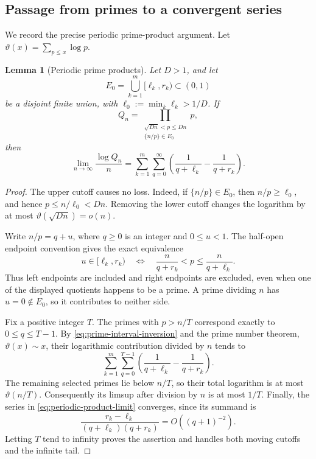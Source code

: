 \documentclass[11pt,reqno,letterpaper]{amsart}
\numberwithin{equation}{section}
\newtheorem{lemma}[theorem]{Lemma}
\theoremstyle{definition}
\theoremstyle{remark}
\begin{document}
\subsection{Passage from primes to a convergent series}

We record the precise periodic prime-product argument.  Let
\(\vartheta(x)=\sum_{p\leq x}\log p\).

\begin{lemma}[Periodic prime products]\label{lem:periodic-prime-product}
Let \(D>1\), and let
\[
 E_0=\bigcup_{k=1}^{m}[\ell_k,r_k)\subset(0,1)
\]
be a disjoint finite union, with \(\ell_0:=\min_k\ell_k>1/D\).
If
\[
 Q_n=\prod_{\substack{\sqrt{Dn}<p\leq Dn\\
                 \{n/p\}\in E_0}}p,
\]
then
\begin{equation}\label{eq:periodic-product-limit}
 \lim_{n\to\infty}\frac{\log Q_n}{n}
 =\sum_{k=1}^{m}\sum_{q=0}^{\infty}
 \left(\frac1{q+\ell_k}-\frac1{q+r_k}\right).
\end{equation}
\end{lemma}

\begin{proof}
The upper cutoff causes no loss.  Indeed, if
\(\{n/p\}\in E_0\), then \(n/p\geq\ell_0\), and hence
\(p\leq n/\ell_0<Dn\).  Removing the lower cutoff changes the logarithm
by at most \(\vartheta(\sqrt{Dn})=o(n)\).

Write \(n/p=q+u\), where \(q\geq0\) is an integer and \(0\leq u<1\).
The half-open endpoint convention gives the exact equivalence
\begin{equation}\label{eq:prime-interval-inversion}
 u\in[\ell_k,r_k)
 \quad\Longleftrightarrow\quad
 \frac{n}{q+r_k}<p\leq\frac{n}{q+\ell_k}.
\end{equation}
Thus left endpoints are included and right endpoints are excluded, even
when one of the displayed quotients happens to be a prime.  A prime
dividing \(n\) has \(u=0\notin E_0\), so it contributes to neither side.

Fix a positive integer \(T\).  The primes with \(p>n/T\) correspond
exactly to \(0\leq q\leq T-1\).  By
\eqref{eq:prime-interval-inversion} and the prime number theorem,
\(\vartheta(x)\sim x\), their logarithmic contribution divided by \(n\)
tends to
\[
 \sum_{k=1}^{m}\sum_{q=0}^{T-1}
 \left(\frac1{q+\ell_k}-\frac1{q+r_k}\right).
\]
The remaining selected primes lie below \(n/T\), so their total
logarithm is at most \(\vartheta(n/T)\).  Consequently its limsup after
division by \(n\) is at most \(1/T\).  Finally, the series in
\eqref{eq:periodic-product-limit} converges, since its summand is
\[
 \frac{r_k-\ell_k}{(q+\ell_k)(q+r_k)}=O((q+1)^{-2}).
\]
Letting \(T\) tend to infinity proves the assertion and handles both
moving cutoffs and the infinite tail.
\end{proof}
\end{document}
